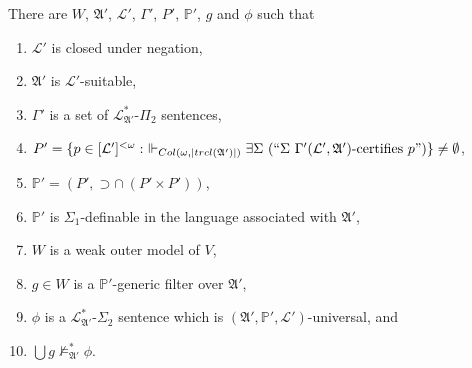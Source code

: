 \documentclass[12pt]{article}
\numberwithin{equation}{section}
\begin{document}
\begin{lem}\label{lem339}
There are $W$, $\mathfrak{A}'$, $\mathcal{L}'$, $\Gamma'$, $P'$, $\mathbb{P}'$, $g$ and $\phi$ such that
\begin{enumerate}[label=(\alph*)]
    \item\label{3391} $\mathcal{L}'$ is closed under negation,
    \item\label{3392} $\mathfrak{A}'$ is $\mathcal{L}'$-suitable,
    \item\label{3393} $\Gamma'$ is a set of $\mathcal{L}^{*}_{\mathfrak{A}'}$-$\Pi_2$ sentences,
    \item\label{3394} $P' = \{p \in [\mathcal{L}']^{< \omega} : \ \Vdash_{Col(\omega, |trcl(\mathfrak{A}')|)} \exists \Sigma \ (``\Sigma \ \Gamma'(\mathcal{L}', \mathfrak{A}') \text{-certifies } p")\} \neq \emptyset$,
    \item\label{3395} $\mathbb{P}' = (P', \supset \cap \ (P' \times P'))$, 
    \item\label{3396} $\mathbb{P}'$ is $\Sigma_1$-definable in the language associated with $\mathfrak{A}'$,
    \item\label{3397} $W$ is a weak outer model of $V$,
    \item\label{3398} $g \in W$ is a $\mathbb{P}'$-generic filter over $\mathfrak{A}'$,
    \item\label{3399} $\phi$ is a $\mathcal{L}^{*}_{\mathfrak{A}'}$-$\Sigma_2$ sentence which is $(\mathfrak{A}', \mathbb{P}', \mathcal{L}')$-universal, and
    \item\label{33910} $\bigcup g \not \models^{*}_{\mathfrak{A}'} \phi$.
\end{enumerate}
\end{lem}
\end{document}
